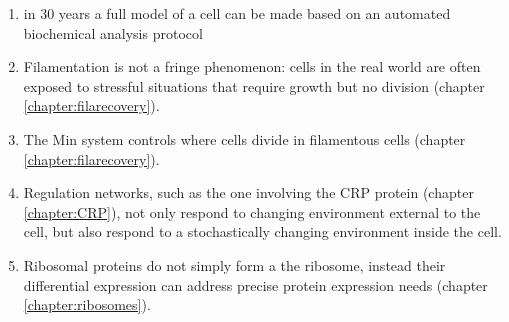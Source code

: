\begin{enumerate}
    \item in 30 years a full model of a cell can be made based on an automated biochemical analysis protocol
    \item Filamentation is not a fringe phenomenon: cells in the real world are often exposed to stressful situations that require growth but no division (chapter \ref{chapter:filarecovery}).
    \item The Min system controls where cells divide in filamentous cells (chapter \ref{chapter:filarecovery}).
    \item Regulation networks, such as the one involving the CRP protein (chapter \ref{chapter:CRP}), not only respond to changing environment external to the cell, but also respond to a stochastically changing environment inside the cell.
    \item Ribosomal proteins do not simply form a the ribosome, instead their differential expression can address precise protein expression needs (chapter \ref{chapter:ribosomes}).
\end{enumerate}


